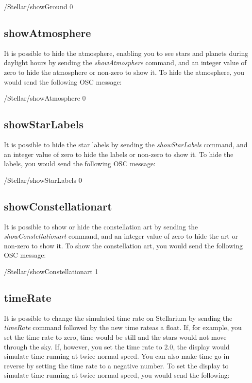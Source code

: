   \begin{syntax}	
 	\medskip
 	/Stellar/showGround 0
 	\medskip
 \end{syntax}

 \subsection{showAtmosphere}
It is possible to hide the atmosphere, enabling you to see stars and planets during daylight hours by sending the \textit{showAtmosphere} command, and an integer value of zero to hide the atmosphere or non-zero to show it. To hide the atmosphere, you would send the following OSC message:

\begin{syntax}	
	\medskip
	/Stellar/showAtmosphere 0
	\medskip
\end{syntax}

 \subsection{showStarLabels}
It is possible to hide the star labels  by sending the \textit{showStarLabels} command, and an integer value of zero to hide the labels or non-zero to show it. To hide the labels, you would send the following OSC message:

\begin{syntax}	
	\medskip
	/Stellar/showStarLabels 0
	\medskip
\end{syntax}

 \subsection{showConstellationart}
It is possible to show or hide the constellation art by sending the \textit{showConstellationart} command, and an integer value of zero to hide the art or non-zero to show it. To show the constellation art, you would send the following OSC message:

\begin{syntax}	
	\medskip
	/Stellar/showConstellationart 1
	\medskip
\end{syntax}

\subsection{timeRate} 
It is possible to change the simulated time rate on Stellarium by sending the \textit{timeRate} command followed by the new time rateas a float. If, for example, you set the time rate to zero, time would be still and the stars would not move through the sky. If, however, you set the time rate to 2.0, the display would simulate time running at twice normal speed. You can also make time go in reverse by setting the time rate to a negative number. To set the display to simulate time running at twice normal speed, you would send the following:

